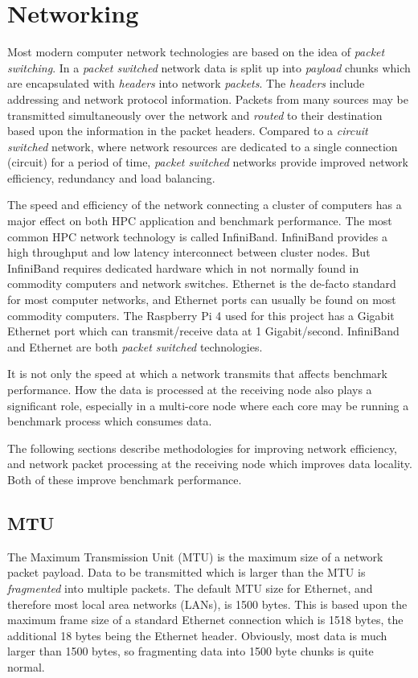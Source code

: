 %
%
\section{Networking}

Most modern computer network technologies are based on the idea of \emph{packet switching}. In a \emph{packet switched} network data is split up into \emph{payload} chunks which are encapsulated with \emph{headers} into network \emph{packets}. The \emph{headers} include addressing and network protocol information. Packets from many sources may be transmitted simultaneously over the network and \emph{routed} to their destination based upon the information in the packet headers. Compared to a \emph{circuit switched} network, where network resources are dedicated to a single connection (circuit) for a period of time, \emph{packet switched} networks provide improved network efficiency, redundancy and load balancing.

The speed and efficiency of the network connecting a cluster of computers has a major effect on both HPC application and benchmark performance. The most common HPC network technology is called InfiniBand. InfiniBand provides a high throughput and low latency interconnect between cluster nodes. But InfiniBand requires dedicated hardware which in not normally found in commodity computers and network switches. Ethernet is the de-facto standard for most computer networks, and Ethernet ports can usually be found on most commodity computers. The Raspberry Pi 4 used for this project has a Gigabit Ethernet port which can transmit/receive data at 1 Gigabit/second. InfiniBand and Ethernet are both \emph{packet switched} technologies.

It is not only the speed at which a network transmits that affects benchmark performance. How the data is processed at the receiving node also plays a significant role, especially in a multi-core node where each core may be running a benchmark process which consumes data.

The following sections describe methodologies for improving network efficiency, and network packet processing at the receiving node which improves data locality. Both of these improve benchmark performance.


\subsection{MTU}

The Maximum Transmission Unit (MTU) is the maximum size of a network packet payload. Data to be transmitted which is larger than the MTU is \emph{fragmented} into multiple packets. The default MTU size for Ethernet, and therefore most local area networks (LANs), is 1500 bytes. This is based upon the maximum frame size of a standard Ethernet connection which is 1518 bytes, the additional 18 bytes being the Ethernet header. Obviously, most data is much larger than 1500 bytes, so fragmenting data into 1500 byte chunks is quite normal.

